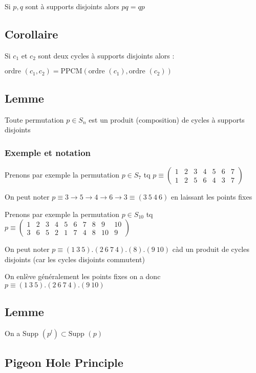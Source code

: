 \documentclass[a4paper,10pt]{article}
\newcommand{\Supp}{\mbox{Supp }}
\newcommand{\ap}{\rightarrow}
\newcommand{\PPCM}{\mbox{PPCM}}
\newcommand{\ordre}{\mbox{ordre }}
\begin{document}
Si $p,q$ sont à supports disjoints alors $pq = qp$

\subsection{Corollaire}

Si $c_1$ et $c_2$ sont deux cycles à supports disjoints alors :

$\ordre(c_1, c_2) = \PPCM( \ordre(c_1) , \ordre(c_2) )$

\subsection{Lemme}

Toute permutation $p \in S_n$ est un produit (composition) de cycles à supports disjoints

\subsubsection{Exemple et notation}

Prenons par exemple la permutation $p \in S_7$ tq $
p \equiv \begin{pmatrix}
1 & 2 & 3 & 4 & 5 & 6 & 7 \\
1 & 2 & 5 & 6 & 4 & 3 & 7
\end{pmatrix}$

On peut noter $p \equiv 3 \ap 5 \ap 4 \ap 6 \ap 3 \equiv (3~5~4~6)$ en laissant les points fixes

Prenons par exemple la permutation $p \in S_{10}$ tq $
p \equiv \begin{pmatrix} 
1 & 2 & 3 & 4 & 5 & 6 & 7 & 8 & 9 & 10 \\
3 & 6 & 5 & 2 & 1 & 7 & 4 & 8 & 10 & 9
\end{pmatrix}$

On peut noter $p \equiv (1~3~5).(2~6~7~4).(8).(9~10)$ càd un produit de cycles disjoints (car les cycles disjoints commutent)

On enlève généralement les points fixes on a donc $p \equiv (1~3~5).(2~6~7~4).(9~10)$

\subsection{Lemme}

On a $\Supp(p^l) \subset \Supp(p)$

\subsection{Pigeon Hole Principle}
\end{document}
